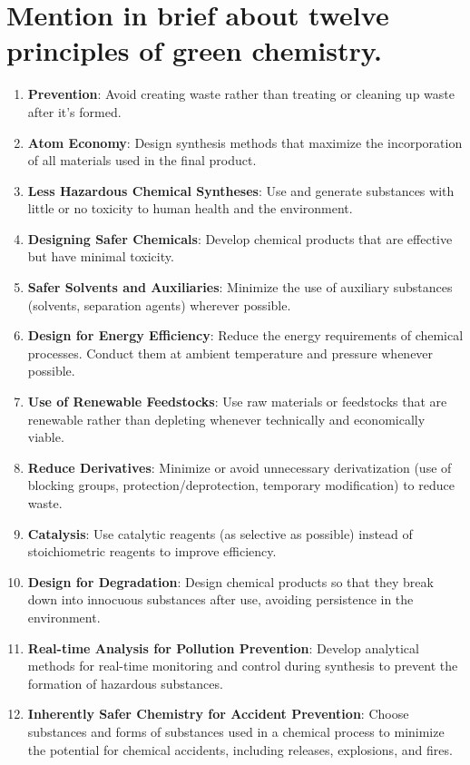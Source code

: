 \documentclass[11pt]{article}
\begin{document}
\tableofcontents
\thispagestyle{empty}
\clearpage

\setcounter{page}{1}

\section{Mention in brief about twelve principles of green chemistry.}

\begin{enumerate}
	\item \textbf{Prevention}: Avoid creating waste rather than treating or cleaning up waste after it's formed.
	\item \textbf{Atom Economy}: Design synthesis methods that maximize the incorporation of all materials used in the final product.
	\item \textbf{Less Hazardous Chemical Syntheses}: Use and generate substances with little or no toxicity to human health and the environment.
	\item \textbf{Designing Safer Chemicals}: Develop chemical products that are effective but have minimal toxicity.
	\item \textbf{Safer Solvents and Auxiliaries}: Minimize the use of auxiliary substances (solvents, separation agents) wherever possible.
	\item \textbf{Design for Energy Efficiency}: Reduce the energy requirements of chemical processes. Conduct them at ambient temperature and pressure whenever possible.
	\item \textbf{Use of Renewable Feedstocks}: Use raw materials or feedstocks that are renewable rather than depleting whenever technically and economically viable.
	\item \textbf{Reduce Derivatives}: Minimize or avoid unnecessary derivatization (use of blocking groups, protection/deprotection, temporary modification) to reduce waste.
	\item \textbf{Catalysis}: Use catalytic reagents (as selective as possible) instead of stoichiometric reagents to improve efficiency.
	\item \textbf{Design for Degradation}: Design chemical products so that they break down into innocuous substances after use, avoiding persistence in the environment.
	\item \textbf{Real-time Analysis for Pollution Prevention}: Develop analytical methods for real-time monitoring and control during synthesis to prevent the formation of hazardous substances.
	\item \textbf{Inherently Safer Chemistry for Accident Prevention}: Choose substances and forms of substances used in a chemical process to minimize the potential for chemical accidents, including releases, explosions, and fires.
\end{enumerate}
\end{document}
